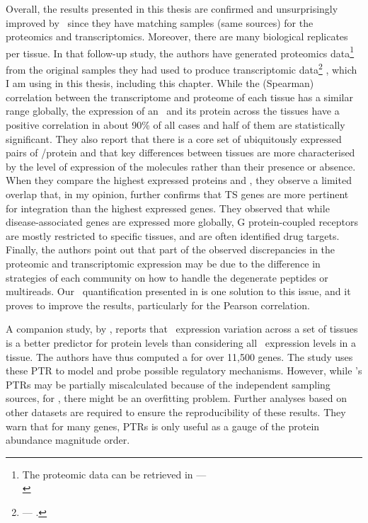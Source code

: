 Overall, the results presented in this thesis
are confirmed and unsurprisingly improved by~\citet{Wang2019-ut}
since they have matching samples (same sources)
for the proteomics and transcriptomics.
Moreover, there are many biological replicates per tissue.
In that follow-up study, the authors have generated proteomics data\footnote{%
The proteomic data can be retrieved in
---\\ }
from the original samples they had used
to produce transcriptomic data\footnote{%
--- .}
, which I am using in this thesis, including this chapter.
While the (Spearman) correlation
between the transcriptome and proteome of each tissue
has a similar range globally,
the expression of an \mRNA\ and its protein across the tissues have
a positive correlation in
about 90\% of all cases and half of them are statistically significant.
They also report that there is
a core set of ubiquitously expressed pairs of \mRNA/protein
and that key differences between tissues are more characterised
by the level of expression of the molecules rather than their presence or absence.
When they compare the highest expressed proteins and \mRNAs,
they observe a limited overlap that, in my opinion,
further confirms that \gls{TS} genes are more pertinent for integration
than the highest expressed genes.
They observed that while disease-associated genes are expressed more globally,
G protein-coupled receptors are mostly restricted to specific tissues,
and are often identified drug targets.
Finally, the authors point out that part of the observed discrepancies
in the proteomic and transcriptomic expression
may be due to the difference in strategies of each community
on how to handle the degenerate peptides or multireads.
Our \PPKM\ quantification presented in 
is one solution to this issue,
and it proves to improve the results,
particularly for the Pearson correlation.\mybr\

A companion study, by \citet{Eraslan2019-md}, reports that
\mRNA\ expression variation across a set of tissues is
a better predictor for protein levels than
considering all \mRNAs\ expression levels in a tissue.
The authors have thus computed a  for over 11,500 genes.
The study uses these \gls{PTR} to model and probe possible regulatory mechanisms.
However, while \citet{Franks2017-bp}'s \glspl{PTR} may be partially miscalculated
because of the independent sampling sources,
for \citet{Eraslan2019-md}, there might be an overfitting problem.
Further analyses based on other datasets are required
to ensure the reproducibility of these results.
They warn that for many genes,
\glspl{PTR} is only useful as a gauge of the protein abundance magnitude order.\mybr\


